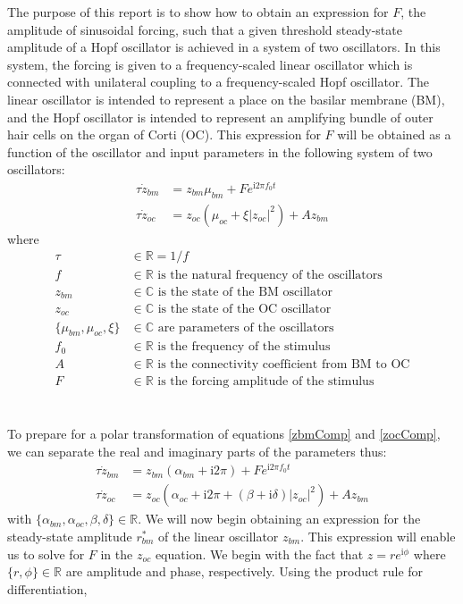 \documentclass{report}
\begin{document}
	
	The purpose of this report is to show how to obtain an expression for $F$, the amplitude of sinusoidal forcing, such that a given threshold steady-state amplitude of a Hopf oscillator is achieved in a system of two oscillators. In this system, the forcing is given to a frequency-scaled linear oscillator which is connected with unilateral coupling to a frequency-scaled Hopf oscillator. The linear oscillator is intended to represent a place on the basilar membrane (BM), and the Hopf oscillator is intended to represent an amplifying bundle of outer hair cells on the organ of Corti (OC). This expression for $F$ will be obtained as a function of the oscillator and input parameters in the following system of two oscillators:
	\begin{align}\label{zbmComp}
		\tau \dot{z}_{bm}&=z_{bm}\mu_{bm}+Fe^{\textrm{i}2\pi f_0t}\\\label{zocComp}
		\tau \dot{z}_{oc}&=z_{oc}(\mu_{oc}+\xi|z_{oc}|^2)+Az_{bm}
	\end{align}
	where
	\begin{align*}
		\tau&\in\mathbb{R}=1/f\\
		f&\in\mathbb{R}\textrm{ is the natural frequency of the oscillators}\\
		z_{bm}&\in\mathbb{C}\textrm{ is the state of the BM oscillator}\\
		z_{oc}&\in\mathbb{C}\textrm{ is the state of the OC oscillator}\\
		\{\mu_{bm},\mu_{oc},\xi\}&\in\mathbb{C}\textrm{ are parameters of the oscillators}\\
		f_0&\in\mathbb{R}\textrm{ is the frequency of the stimulus}\\
		A&\in\mathbb{R}\textrm{ is the connectivity coefficient from BM to OC}\\
		F&\in\mathbb{R}\textrm{ is the forcing amplitude of the stimulus}
	\end{align*}\\\\
	To prepare for a polar transformation of equations \eqref{zbmComp} and \eqref{zocComp}, we can separate the real and imaginary parts of the parameters thus:
	\begin{align}
		\tau \dot{z}_{bm}&=z_{bm}(\alpha_{bm}+\textrm{i}2\pi)+Fe^{\textrm{i}2\pi f_0t}\\\label{zoc}
		\tau \dot{z}_{oc}&=z_{oc}(\alpha_{oc}+\textrm{i}2\pi+(\beta+\textrm{i}\delta)|z_{oc}|^2)+Az_{bm}
	\end{align}
	with $\{\alpha_{bm}, \alpha_{oc}, \beta, \delta\}\in\mathbb{R}$. We will now begin obtaining an expression for the steady-state amplitude $r^{*}_{bm}$ of the linear oscillator $z_{bm}$. This expression will enable us to solve for $F$ in the $z_{oc}$ equation. We begin with the fact that $z=re^{\textrm{i}\phi}$ where $\{r, \phi\}\in\mathbb{R}$ are amplitude and phase, respectively. Using the product rule for differentiation,
\end{document}
